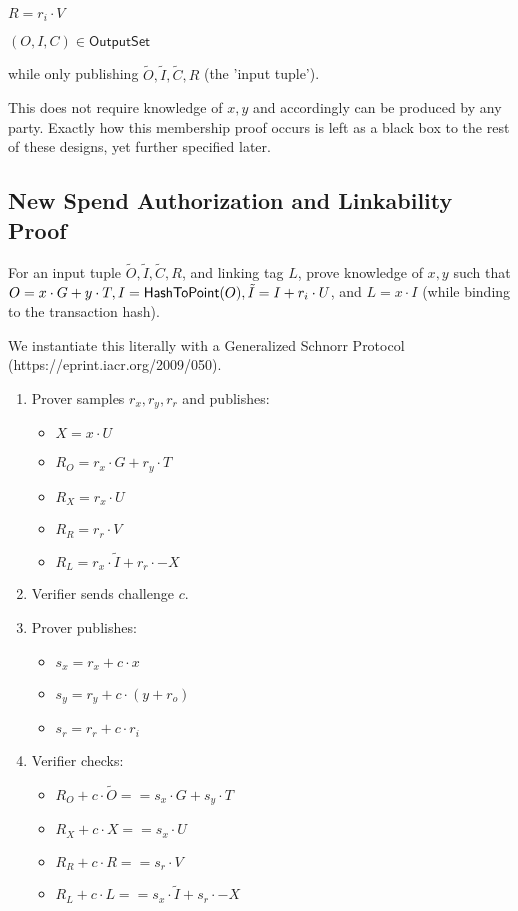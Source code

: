 \documentclass[]{article}
\begin{document}
$R = r_i \cdot V$

$(O, I, C) \in \mathsf{OutputSet}$

while only publishing $\tilde{O}, \tilde{I}, \tilde{C}, R$ (the 'input tuple').

This does not require knowledge of $x, y$ and accordingly can be produced by any party. Exactly how this membership proof occurs is left as a black box to the rest of these designs, yet further specified later.

\subsection{New Spend Authorization and Linkability Proof}

For an input tuple $\tilde{O}, \tilde{I}, \tilde{C}, R$, and linking tag $L$, prove knowledge of $x, y$ such that $O = x \cdot G + y \cdot T, I = \mathsf{HashToPoint}(O), \tilde{I} = I + r_i \cdot U$, and $L = x \cdot I$ (while binding to the transaction hash).

We instantiate this literally with a Generalized Schnorr Protocol (https://eprint.iacr.org/2009/050).

\begin{enumerate}
	\item
	Prover samples $r_x, r_y, r_r$ and publishes:
	\begin{itemize}
		\item
		$X = x \cdot U$	
		\item
		$R_O = r_x \cdot G + r_y \cdot T$
		\item
		$R_X = r_x \cdot U$
		\item
		$R_R = r_r \cdot V$
		\item
		$R_L = r_x \cdot \tilde{I} + r_r \cdot -X$
	\end{itemize}
	\item
	Verifier sends challenge $c$.
	\item
	Prover publishes:
	\begin{itemize}
		\item
		$s_x = r_x + c \cdot x$	
		\item
		$s_y = r_y + c \cdot (y + r_o)$
		\item
		$s_r = r_r + c \cdot r_i$
	\end{itemize}
	\item
	Verifier checks:
	\begin{itemize}
		\item
		$R_O + c \cdot \tilde{O} == s_x \cdot G + s_y \cdot T$
		\item
		$R_X + c \cdot X == s_x \cdot U$
		\item
		$R_R + c \cdot R == s_r \cdot V$
		\item
		$R_L + c \cdot L == s_x \cdot \tilde{I} + s_r \cdot -X$
	\end{itemize}
\end{enumerate}
\end{document}
